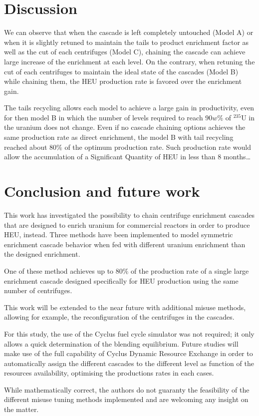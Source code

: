 \section{Discussion}

We can observe that when the cascade is left completely untouched (Model A) or
when it is slightly retuned to maintain the tails to product enrichment factor
as well as the cut of each centrifuges (Model C), chaining the cascade can
achieve large increase of the enrichment at each level.  On the contrary, when
retuning the cut of each centrifuges to maintain the ideal state of the cascades
(Model B) while chaining them, the \gls{HEU} production rate is favored over the
enrichment gain.

The tails recycling allows each model to achieve a large gain in productivity,
even for then model B in which the number of levels required to reach $90w\%$ of
$^{235}$U in the uranium does not change. Even if no cascade chaining options
achieves the same production rate as direct enrichment, the model B with tail
recycling reached about $80\%$ of the optimum production rate. Such production
rate would allow the accumulation of a Significant Quantity of \gls{HEU} in less
than 8 months\ldots


\section{Conclusion and future work}

This work has investigated the possibility to chain centrifuge enrichment
cascades that are designed to enrich uranium for commercial reactors in order to
produce \gls{HEU}, instead. Three methods have been implemented to model
symmetric enrichment cascade behavior when fed with different uranium enrichment
than the designed enrichment. 

One of these method achieves up to $80\%$ of the production rate of a single
large enrichment cascade designed specifically for \gls{HEU} production using
the same number of centrifuges.

This work will be extended to the near future with additional misuse methods,
allowing for example, the reconfiguration of the centrifuges in the cascades.

For this study, the use of the Cyclus fuel cycle simulator was not required;
it only allows a quick determination of the blending equilibrium. Future
studies will make use of the full capability of Cyclus Dynamic Resource
Exchange in order to automatically assign the different cascades to the
different level as function of the resources availability, optimising the
productions rates in each cases.

While mathematically correct, the authors do not guaranty the feasibility of the
different misuse tuning methods implemented and are welcoming any insight on the
matter.


